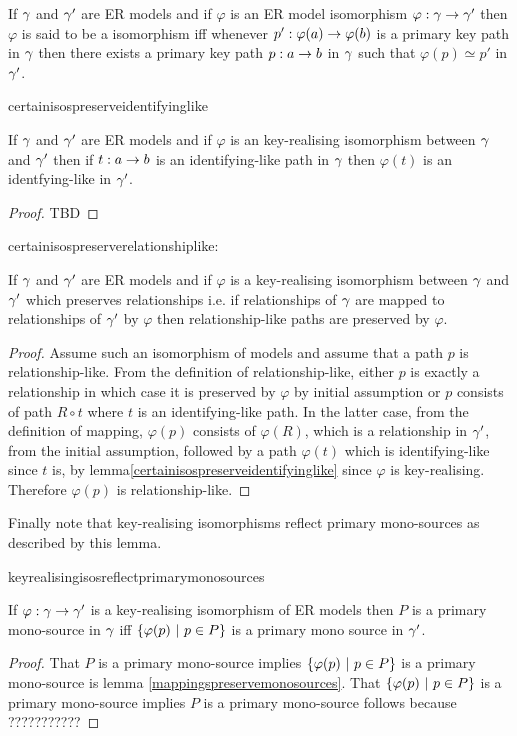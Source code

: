 \begin{definition}
If $\gamma$ and $\gamma'$ are ER models and if $\varphi$ is an ER model isomorphism 
$\varphi: \gamma  \rightarrow \gamma'$ then $\varphi$ is said to be a  isomorphism iff
whenever $p':\varphi(a) \rightarrow \varphi(b)$ is a primary key path in $\gamma$ then there exists 
a primary key path $p:a \rightarrow b$ in $\gamma$ such that $\varphi(p) \simeq p'$ in $\gamma'$.
\end{definition} 


certainisospreserveidentifyinglike
\begin{lemma}
\label{certainisospreserveidentifyinglike}
If $\gamma$ and $\gamma'$ are ER models and  if  $\varphi$ is an key-realising isomorphism between $\gamma$ and $\gamma'$ then if $t:a \rightarrow b$ is an identifying-like  path in $\gamma$ then $\varphi(t)$ is an identfying-like in $\gamma'$.
\end{lemma}
\begin{proof}
TBD
\end{proof}

certainisospreserverelationshiplike:
\begin{lemma}
\label{certainisospreserverelationshiplike}
If $\gamma$ and $\gamma'$ are ER models and  if  $\varphi$ is a key-realising isomorphism between $\gamma$ and $\gamma'$  which preserves relationships  i.e. if relationships of $\gamma$ are mapped to relationships of $\gamma'$ by  $\varphi$ then relationship-like paths are preserved by $\varphi$.
\end{lemma}
\begin{proof}
Assume such an isomorphism of models and assume that a path $p$ is relationship-like.
From the definition of relationship-like, either $p$ is exactly a relationship in which case it is preserved by $\varphi$ by initial assumption or $p$ consists of path $R \circ t$ where $t$ is an identifying-like path.
In the latter case, from the definition of mapping, $\varphi(p)$ consists of $\varphi(R)$, which is a relationship in $\gamma'$, from the initial assumption, followed by a path $\varphi(t)$ which is identifying-like since $t$ is, by lemma\ref{certainisospreserveidentifyinglike} since $\varphi$ is key-realising. Therefore $\varphi(p)$ is relationship-like.
\end{proof}

Finally note that key-realising isomorphisms reflect primary mono-sources as described by this
lemma.

keyrealisingisosreflectprimarymonosources
\begin{lemma}
\label{keyrealisingisosreflectprimarymonosources}
If $\varphi: \gamma \rightarrow \gamma'$ is a key-realising isomorphism of ER models then
 $P$ is a primary mono-source in $\gamma$ iff $\left\{\varphi(p) \ \middle|\ p\in P\right\}$ is a primary mono source in $\gamma'$.
\end{lemma}
\begin{proof}
That $P$ is a primary mono-source implies $\left\{\varphi(p) \ \middle|\ p\in P\right\}$ is a primary mono-source is lemma \ref{mappingspreservemonosources}.
That $\left\{\varphi(p) \ \middle|\ p\in P\right\}$ is a primary mono-source implies $P$ is a primary mono-source follows because ???????????
\end{proof}

